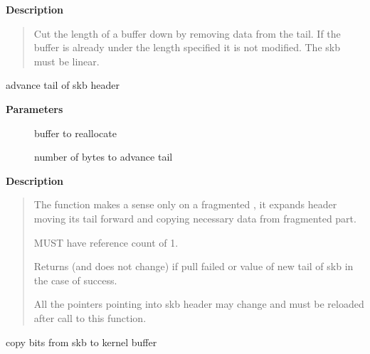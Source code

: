 \documentclass[a4paper,8pt,english]{sphinxmanual}
\begin{document}
\textbf{Description}
\begin{quote}

Cut the length of a buffer down by removing data from the tail. If
the buffer is already under the length specified it is not modified.
The skb must be linear.
\end{quote}

\begin{fulllineitems}
\label{networking/kapi:c.__pskb_pull_tail}
advance tail of skb header

\end{fulllineitems}


\textbf{Parameters}
\begin{description}
\item[{}] \leavevmode
buffer to reallocate

\item[{}] \leavevmode
number of bytes to advance tail

\end{description}

\textbf{Description}
\begin{quote}

The function makes a sense only on a fragmented {\hyperref[networking/kapi:c.sk_buff]{\emph{}}},
it expands header moving its tail forward and copying necessary
data from fragmented part.

{\hyperref[networking/kapi:c.sk_buff]{\emph{}}} MUST have reference count of 1.

Returns  (and {\hyperref[networking/kapi:c.sk_buff]{\emph{}}} does not change) if pull failed
or value of new tail of skb in the case of success.

All the pointers pointing into skb header may change and must be
reloaded after call to this function.
\end{quote}

\begin{fulllineitems}
\label{networking/kapi:c.skb_copy_bits}
copy bits from skb to kernel buffer

\end{fulllineitems}
\end{document}
